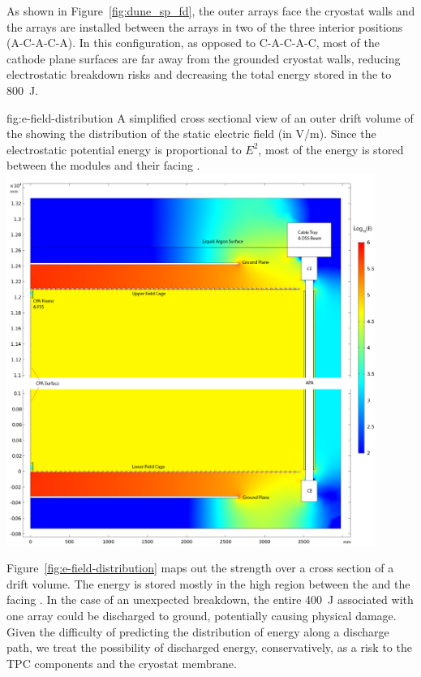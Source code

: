 As shown in Figure~\ref{fig:dune_sp_fd}, the outer  arrays face the cryostat walls and the  arrays are installed between the  arrays in two of the three interior positions (A-C-A-C-A).
In this configuration, as opposed to C-A-C-A-C,  most of the cathode plane surfaces are far away from the grounded cryostat walls, reducing electrostatic breakdown risks and decreasing the total energy stored in the \efield to \SI{800}{J}.

\begin{dunefigure}
{fig:e-field-distribution}
{A simplified cross sectional view of an outer drift volume of the  showing the distribution of the static electric field (in V/m).  Since the electrostatic potential energy is proportional to $E^2$, most of the energy is stored between the  modules and their facing .   }
\centering
\includegraphics[width=0.9\textwidth]{graphics/E_Field_Distribution.png} 
\end{dunefigure}

Figure~\ref{fig:e-field-distribution} maps out the \efield strength over a cross section of a drift volume.  
The energy is stored mostly in the high \efield{} region between the  and the facing .  In the case of an unexpected  breakdown, the entire \SI{400}{J} associated with one  array could be discharged to ground,
potentially causing physical damage.
Given the difficulty of predicting the distribution of energy along a discharge path, we treat the possibility of discharged energy, conservatively, as a risk to the TPC components and the cryostat membrane. 


